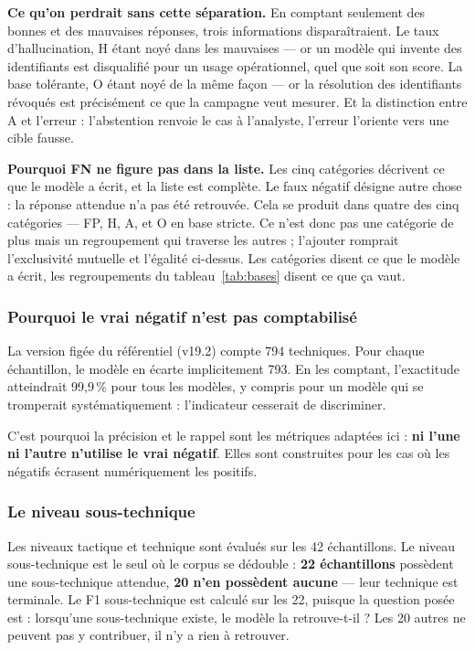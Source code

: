 \textbf{Ce qu'on perdrait sans cette séparation.} En comptant seulement des bonnes et des mauvaises réponses, trois informations disparaîtraient. Le taux d'hallucination, H étant noyé dans les mauvaises --- or un modèle qui invente des identifiants est disqualifié pour un usage opérationnel, quel que soit son score. La base tolérante, O étant noyé de la même façon --- or la résolution des identifiants révoqués est précisément ce que la campagne veut mesurer. Et la distinction entre A et l'erreur : l'abstention renvoie le cas à l'analyste, l'erreur l'oriente vers une cible fausse.

\textbf{Pourquoi FN ne figure pas dans la liste.} Les cinq catégories décrivent ce que le modèle a écrit, et la liste est complète. Le faux négatif désigne autre chose : la réponse attendue n'a pas été retrouvée. Cela se produit dans quatre des cinq catégories --- FP, H, A, et O en base stricte. Ce n'est donc pas une catégorie de plus mais un regroupement qui traverse les autres ; l'ajouter romprait l'exclusivité mutuelle et l'égalité ci-dessus. Les catégories disent ce que le modèle a écrit, les regroupements du tableau~\ref{tab:bases} disent ce que ça vaut.

\subsubsection{Pourquoi le vrai négatif n'est pas comptabilisé}\label{sec:2-3}
La version figée du référentiel (v19.2) compte 794 techniques. Pour chaque échantillon, le modèle en écarte implicitement 793. En les comptant, l'exactitude atteindrait 99,9\,\% pour tous les modèles, y compris pour un modèle qui se tromperait systématiquement : l'indicateur cesserait de discriminer.

C'est pourquoi la précision et le rappel sont les métriques adaptées ici : \textbf{ni l'une ni l'autre n'utilise le vrai négatif}. Elles sont construites pour les cas où les négatifs écrasent numériquement les positifs.

\subsubsection{Le niveau sous-technique}\label{sec:2-4}
Les niveaux tactique et technique sont évalués sur les 42 échantillons. Le niveau sous-technique est le seul où le corpus se dédouble : \textbf{22 échantillons} possèdent une sous-technique attendue, \textbf{20 n'en possèdent aucune} --- leur technique est terminale. Le F1 sous-technique est calculé sur les 22, puisque la question posée est : lorsqu'une sous-technique existe, le modèle la retrouve-t-il ? Les 20 autres ne peuvent pas y contribuer, il n'y a rien à retrouver.

